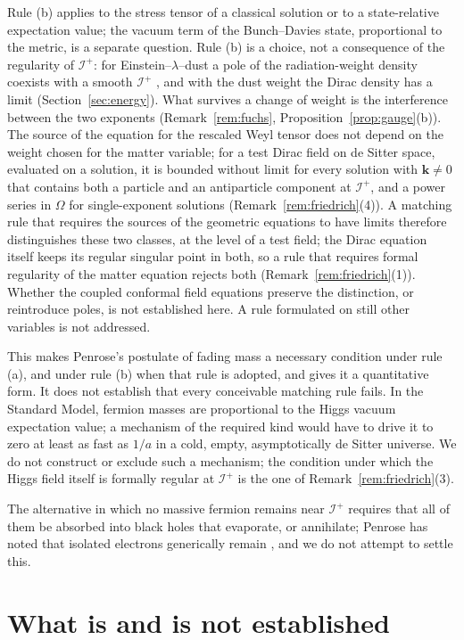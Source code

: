 \documentclass[11pt,a4paper]{article}
\theoremstyle{definition}
\newcommand{\scri}{\mathscr{I}^{+}}
\begin{document}
Rule (b) applies to the stress tensor of a classical solution or to a state-relative expectation value; the vacuum term of the Bunch--Davies state, proportional to the metric, is a separate question. Rule (b) is a choice, not a consequence of the regularity of $\scri$: for Einstein--$\lambda$--dust a pole of the radiation-weight density coexists with a smooth $\scri$ \cite{Friedrich2017}, and with the dust weight the Dirac density has a limit (Section~\ref{sec:energy}). What survives a change of weight is the interference between the two exponents (Remark~\ref{rem:fuchs}, Proposition~\ref{prop:gauge}(b)). The source of the equation for the rescaled Weyl tensor does not depend on the weight chosen for the matter variable; for a test Dirac field on de Sitter space, evaluated on a solution, it is bounded without limit for every solution with $\mathbf{k}\neq0$ that contains both a particle and an antiparticle component at $\scri$, and a power series in $\Omega$ for single-exponent solutions (Remark~\ref{rem:friedrich}(4)). A matching rule that requires the sources of the geometric equations to have limits therefore distinguishes these two classes, at the level of a test field; the Dirac equation itself keeps its regular singular point in both, so a rule that requires formal regularity of the matter equation rejects both (Remark~\ref{rem:friedrich}(1)). Whether the coupled conformal field equations preserve the distinction, or reintroduce poles, is not established here. A rule formulated on still other variables is not addressed.

This makes Penrose's postulate of fading mass a necessary condition under rule (a), and under rule (b) when that rule is adopted, and gives it a quantitative form. It does not establish that every conceivable matching rule fails. In the Standard Model, fermion masses are proportional to the Higgs vacuum expectation value; a mechanism of the required kind would have to drive it to zero at least as fast as $1/a$ in a cold, empty, asymptotically de Sitter universe. We do not construct or exclude such a mechanism; the condition under which the Higgs field itself is formally regular at $\scri$ is the one of Remark~\ref{rem:friedrich}(3).

The alternative in which no massive fermion remains near $\scri$ requires that all of them be absorbed into black holes that evaporate, or annihilate; Penrose has noted that isolated electrons generically remain \cite{Penrose2010}, and we do not attempt to settle this.

\section{What is and is not established}
\label{sec:scope}
\end{document}
